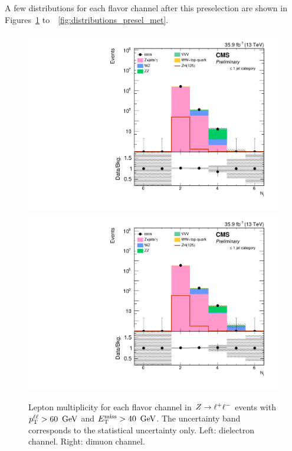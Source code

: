 A few distributions for each flavor channel after this preselection are shown in 
Figures~\ref{fig:distributions_zsel_nlep} to~~\ref{fig:distributions_presel_met}.

\begin{figure}[!hbtp]
\begin{center}
\includegraphics[width=\cmsFigWidth]{figures/zsel_nlep_ee.pdf}
\includegraphics[width=\cmsFigWidth]{figures/zsel_nlep_mm.pdf}
\caption{
  Lepton multiplicity for each flavor channel in $Z\to\ell^+\ell^-$ events with $p_{\mathrm{T}}^{\ell\ell} > 60~\,\text{Ge\hspace{-.08em}V}$ and $E_\mathrm{T}^{\mathrm{miss}} > 40~\,\text{Ge\hspace{-.08em}V}$. 
  The uncertainty band corresponds to the statistical uncertainty only. Left: dielectron channel. Right: dimuon channel.
}
\label{fig:distributions_zsel_nlep}
\end{center}
\end{figure}
